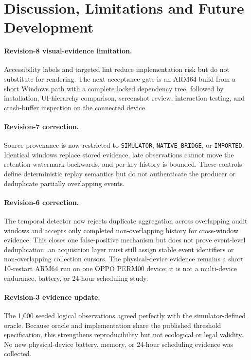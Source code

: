 \newpage
\section{Discussion, Limitations and Future Development}

\paragraph{Revision-8 visual-evidence limitation.} Accessibility labels and targeted lint reduce implementation risk but do not substitute for rendering. The next acceptance gate is an ARM64 build from a short Windows path with a complete locked dependency tree, followed by installation, UI-hierarchy comparison, screenshot review, interaction testing, and crash-buffer inspection on the connected device.

\paragraph{Revision-7 correction.} Source provenance is now restricted to \texttt{SIMULATOR}, \texttt{NATIVE\_BRIDGE}, or \texttt{IMPORTED}. Identical windows replace stored evidence, late observations cannot move the retention watermark backwards, and per-key history is bounded. These controls define deterministic replay semantics but do not authenticate the producer or deduplicate partially overlapping events.

\paragraph{Revision-6 correction.} The temporal detector now rejects duplicate aggregation across overlapping audit windows and accepts only completed non-overlapping history for cross-window evidence. This closes one false-positive mechanism but does not prove event-level deduplication: an acquisition layer must still assign stable event identifiers or non-overlapping collection cursors. The physical-device evidence remains a short 10-restart ARM64 run on one OPPO PERM00 device; it is not a multi-device endurance, battery, or 24-hour scheduling study.

\paragraph{Revision-3 evidence update.} The 1,000 seeded logical observations agreed perfectly with the simulator-defined oracle. Because oracle and implementation share the published threshold specification, this strengthens reproducibility but not ecological or legal validity. No new physical-device battery, memory, or 24-hour scheduling evidence was collected.

